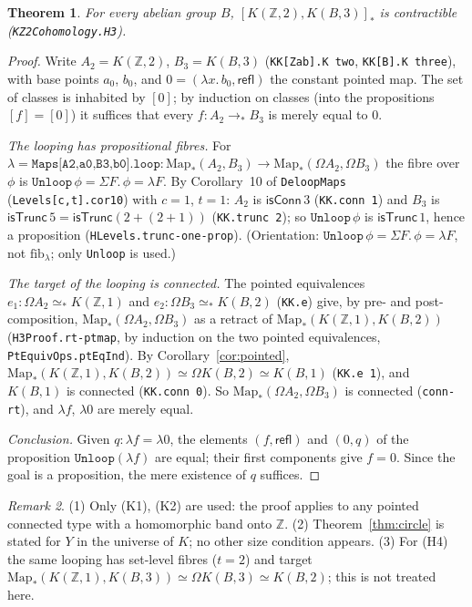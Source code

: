 \documentclass[11pt]{amsart}
\newtheorem{theorem}{Theorem}
\theoremstyle{definition}
\theoremstyle{remark}
\newtheorem{remark}[theorem]{Remark}
\newcommand{\Om}{\Omega}
\newcommand{\Map}{\mathrm{Map}_*}
\newcommand{\fib}{\mathrm{fib}}
\newcommand{\Z}{\mathbb{Z}}
\newcommand{\code}[1]{\texttt{#1}}
\newcommand{\cT}{\mathsf{isTrunc}}
\newcommand{\cC}{\mathsf{isConn}}
\begin{document}
\begin{theorem}\label{thm:H3}
For every abelian group $B$, $[K(\Z,2),K(B,3)]_*$ is contractible
(\code{KZ2Cohomology.H3}).
\end{theorem}
\begin{proof}
Write $A_2=K(\Z,2)$, $B_3=K(B,3)$ (\code{KK[Zab].K two},
\code{KK[B].K three}), with base points $a_0$, $b_0$, and $0=(\lambda
x.\,b_0,\mathsf{refl})$ the constant pointed map. The set of classes is
inhabited by $[0]$; by induction on classes (into the propositions $[f]=[0]$)
it suffices that every $f:A_2\to_*B_3$ is merely equal to $0$.

\emph{The looping has propositional fibres.} For
$\lambda=\code{Maps[A2,a0,B3,b0].loop}:\Map(A_2,B_3)\to\Map(\Om A_2,\Om B_3)$ the
fibre over $\phi$ is $\code{Unloop}\,\phi=\Sigma F.\,\phi=\lambda F$.
By Corollary~10 of \code{DeloopMaps} (\code{Levels[c,t].cor10}) with
$c=1$, $t=1$: $A_2$ is $\cC\,3$ (\code{KK.conn 1}) and $B_3$ is
$\cT\,5=\cT(2+(2+1))$ (\code{KK.trunc 2}); so $\code{Unloop}\,\phi$ is
$\cT\,1$, hence a proposition (\code{HLevels.trunc-one-prop}). (Orientation:
$\code{Unloop}\,\phi=\Sigma F.\,\phi=\lambda F$, not $\fib_\lambda$; only
\code{Unloop} is used.)

\emph{The target of the looping is connected.} The pointed equivalences
$e_1:\Om A_2\simeq_*K(\Z,1)$ and $e_2:\Om B_3\simeq_*K(B,2)$ (\code{KK.e}) give,
by pre- and post-composition, $\Map(\Om A_2,\Om B_3)$ as a retract of
$\Map(K(\Z,1),K(B,2))$ (\code{H3Proof.rt-ptmap}, by induction on the two
pointed equivalences, \code{PtEquivOps.ptEqInd}). By
Corollary~\ref{cor:pointed}, $\Map(K(\Z,1),K(B,2))\simeq\Om K(B,2)\simeq
K(B,1)$ (\code{KK.e 1}), and $K(B,1)$ is connected (\code{KK.conn 0}).
So $\Map(\Om A_2,\Om B_3)$ is connected (\code{conn-rt}), and $\lambda f$, $\lambda 0$ are
merely equal.

\emph{Conclusion.} Given $q:\lambda f=\lambda 0$, the elements
$(f,\mathsf{refl})$ and $(0,q)$ of the proposition
$\code{Unloop}(\lambda f)$ are equal; their first components give
$f=0$. Since the goal is a proposition, the mere existence of $q$ suffices.
\end{proof}

\begin{remark}
(1) Only (K1), (K2) are used: the proof applies to any pointed connected
type with a homomorphic band onto $\Z$. (2) Theorem~\ref{thm:circle} is
stated for $Y$ in the universe of $K$; no other size condition appears.
(3) For (H4) the same looping has set-level fibres ($t=2$) and target
$\Map(K(\Z,1),K(B,3))\simeq\Om K(B,3)\simeq K(B,2)$; this is not treated
here.
\end{remark}
\end{document}
